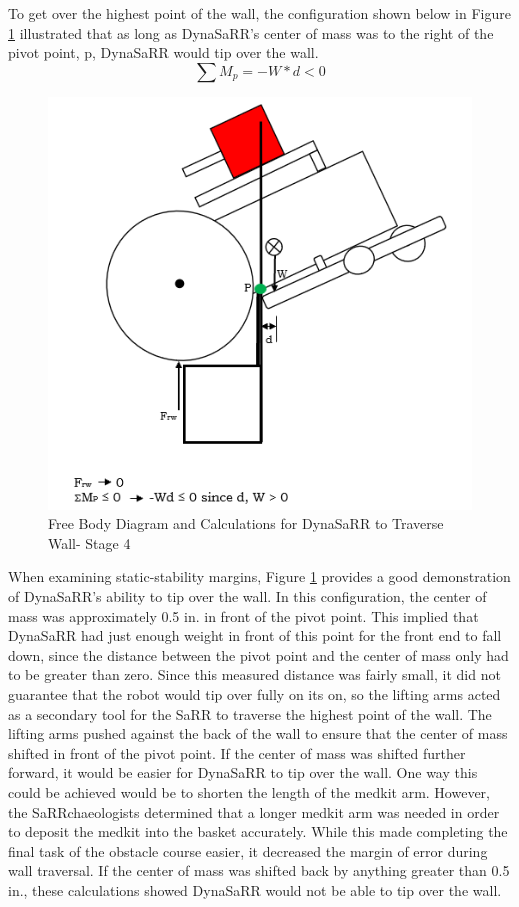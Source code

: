 To get over the highest point of the wall, the configuration shown below in Figure \ref{fig:analysis6_wall4} illustrated that as long as DynaSaRR's center of mass was to the right of the pivot point, p, DynaSaRR would tip over the wall. 
\begin{equation}
    \sum M_{p} = -W*d<0
\end{equation}
\label{fig:analysis6_wall4}
\begin{figure}[hb]
    \centering
    \includegraphics[width=0.6\linewidth]{Images/analysis6_wall4.png}
    \caption{Free Body Diagram and Calculations for DynaSaRR to Traverse Wall- Stage 4}
    \label{fig:analysis6_wall4}
\end{figure}
\vfill
\newpage

When examining static-stability margins, Figure \ref{fig:analysis6_wall4} provides a good demonstration of DynaSaRR's ability to tip over the wall. In this configuration, the center of mass was approximately 0.5 in. in front of the pivot point. This implied that DynaSaRR had just enough weight in front of this point for the front end to fall down, since the distance between the pivot point and the center of mass only had to be greater than zero. Since this measured distance was fairly small, it did not guarantee that the robot would tip over fully on its on, so the lifting arms acted as a secondary tool for the SaRR to traverse the highest point of the wall. The lifting arms pushed against the back of the wall to ensure that the center of mass shifted in front of the pivot point. If the center of mass was shifted further forward, it would be easier for DynaSaRR to tip over the wall. One way this could be achieved would be to shorten the length of the medkit arm. However, the SaRRchaeologists determined that a longer medkit arm was needed in order to deposit the medkit into the basket accurately. While this made completing the final task of the obstacle course easier, it decreased the margin of error during wall traversal. If the center of mass was shifted back by anything greater than 0.5 in., these calculations showed DynaSaRR would not be able to tip over the wall.

